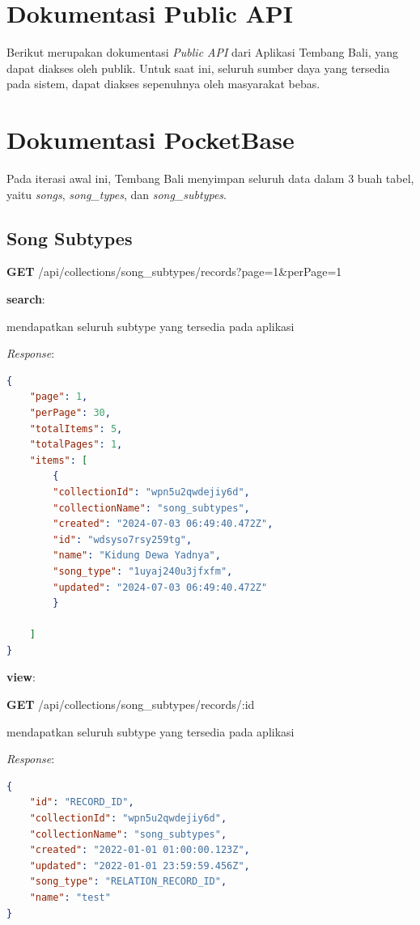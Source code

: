 \documentclass[a4paper, 12pt]{article}
\begin{document}
\section{Dokumentasi Public API}
Berikut merupakan dokumentasi \textit{Public API} dari Aplikasi Tembang Bali, yang dapat diakses oleh publik. Untuk saat ini, seluruh sumber daya yang tersedia pada sistem, dapat diakses sepenuhnya oleh masyarakat bebas.\


\section{Dokumentasi PocketBase}
Pada iterasi awal ini, Tembang Bali menyimpan seluruh data dalam 3 buah tabel, yaitu \textit{songs}, \textit{song\_types}, dan \textit{song\_subtypes}.

\subsection*{Song Subtypes}
\textbf{GET} /api/collections/song\_subtypes/records?page=1\&perPage=1

\textbf{search}:

\indent mendapatkan seluruh subtype yang tersedia pada aplikasi

\textit{Response}:
\begin{lstlisting}[language=json,firstnumber=1]
{
    "page": 1,
    "perPage": 30,
    "totalItems": 5,
    "totalPages": 1,
    "items": [
        {
        "collectionId": "wpn5u2qwdejiy6d",
        "collectionName": "song_subtypes",
        "created": "2024-07-03 06:49:40.472Z",
        "id": "wdsyso7rsy259tg",
        "name": "Kidung Dewa Yadnya",
        "song_type": "1uyaj240u3jfxfm",
        "updated": "2024-07-03 06:49:40.472Z"
        }

    ]
}
        \end{lstlisting}

\textbf{view}:

\textbf{GET} /api/collections/song\_subtypes/records/:id

\indent mendapatkan seluruh subtype  yang tersedia pada aplikasi

\textit{Response}:
\begin{lstlisting}[language=json,firstnumber=1]
{
    "id": "RECORD_ID",
    "collectionId": "wpn5u2qwdejiy6d",
    "collectionName": "song_subtypes",
    "created": "2022-01-01 01:00:00.123Z",
    "updated": "2022-01-01 23:59:59.456Z",
    "song_type": "RELATION_RECORD_ID",
    "name": "test"
}
\end{lstlisting}
\end{document}
